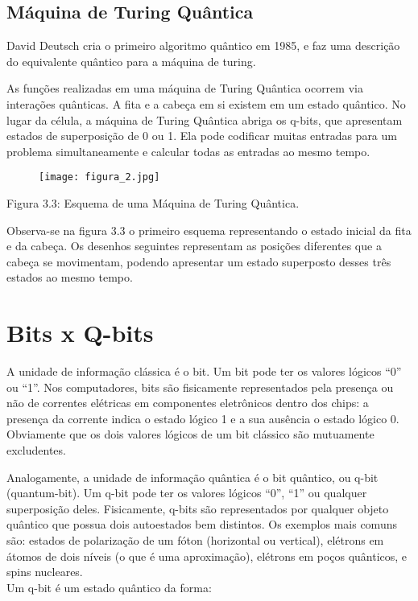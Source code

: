 \documentclass[12pt, a4paper, oneside]{article}
\begin{document}
\subsection{Máquina de Turing Quântica}

\par David Deutsch cria o primeiro algoritmo quântico em 1985, e faz uma descrição
do equivalente quântico para a máquina de turing.
\par As funções realizadas em uma máquina de Turing Quântica ocorrem via interações quânticas. A fita e a cabeça em si existem em um estado quântico. No lugar da célula, a máquina
de Turing Quântica abriga os q-bits, que apresentam estados de superposição de 0 ou 1.
Ela pode codificar muitas entradas para um problema simultaneamente e calcular todas as
entradas ao mesmo tempo.\\

\begin{figure}
\centering 
\texttt{[image: figura\_2.jpg]} 
\end{figure}

Figura 3.3: Esquema de uma Máquina de Turing Quântica.\\

\par Observa-se na figura 3.3 o primeiro esquema representando o estado inicial da fita e da 
cabeça. Os desenhos seguintes representam as posições diferentes que a cabeça se movimentam, podendo apresentar um estado superposto desses três estados ao mesmo tempo.



\section{Bits x Q-bits}

\par A unidade de informação clássica é o bit. Um bit pode ter os valores lógicos “0”
ou “1”. Nos computadores, bits são fisicamente representados pela presença
ou não de correntes elétricas em componentes eletrônicos dentro dos chips: a
presença da corrente indica o estado lógico 1 e a sua ausência o estado lógico
0. Obviamente que os dois valores lógicos de um bit clássico são mutuamente
excludentes.
\par Analogamente, a unidade de informação quântica é o bit quântico, ou
q-bit (quantum-bit). Um q-bit pode ter os valores lógicos “0”, “1” ou qualquer superposição
deles. Fisicamente, q-bits são representados por qualquer objeto quântico que
possua dois autoestados bem distintos. Os exemplos mais comuns são: estados
de polarização de um fóton (horizontal ou vertical), elétrons em átomos de
dois níveis (o que é uma aproximação), elétrons em poços quânticos, e spins
nucleares.\\
Um q-bit é um estado quântico da forma:
\end{document}
